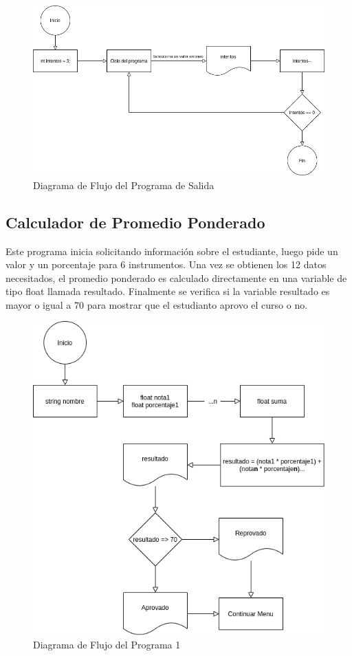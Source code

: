\documentclass[12pt]{article}
\begin{document}
\begin{figure}[H]
    \caption{Diagrama de Flujo del Programa de Salida }
    \centering
    \includegraphics[scale=0.4]{programa_salida.png}
\end{figure}

\pagebreak

\subsection{Calculador de Promedio Ponderado}

Este programa inicia solicitando información sobre el estudiante, luego pide un valor y un porcentaje para 6 instrumentos. Una vez se obtienen los 12 datos necesitados, el promedio ponderado es calculado directamente en una variable de tipo float llamada resultado. Finalmente se verifica si la variable resultado es mayor o igual a 70 para mostrar que el estudianto aprovo el curso o no.


\begin{figure}[H]
    \caption{Diagrama de Flujo del Programa 1}
    \centering
    \includegraphics[scale=0.5]{programa1.png}
\end{figure}
\end{document}
